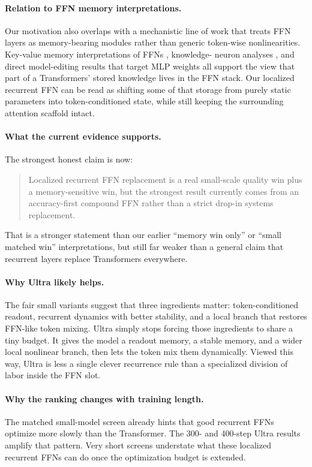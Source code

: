 \documentclass[11pt]{article}
\begin{document}
\paragraph{Relation to FFN memory interpretations.}
Our motivation also overlaps with a mechanistic line of work that treats FFN
layers as memory-bearing modules rather than generic token-wise nonlinearities.
Key-value memory interpretations of FFNs \citep{geva2020ffnmem}, knowledge-
neuron analyses \citep{dai2021knowledge}, and direct model-editing results that
target MLP weights \citep{meng2022rome} all support the view that part of a
Transformers' stored knowledge lives in the FFN stack. Our localized
recurrent FFN can be read as shifting some of that storage from purely static
parameters into token-conditioned state, while still keeping the surrounding
attention scaffold intact.

\paragraph{What the current evidence supports.}
The strongest honest claim is now:
\begin{quote}
Localized recurrent FFN replacement is a real small-scale quality win plus a
memory-sensitive win, but the strongest result currently comes from an
accuracy-first compound FFN rather than a strict drop-in systems replacement.
\end{quote}
That is a stronger statement than our earlier ``memory win only'' or ``small
matched win'' interpretations, but still far weaker than a general claim that
recurrent layers replace Transformers everywhere.

\paragraph{Why Ultra likely helps.}
The fair small variants suggest that three ingredients matter: token-conditioned
readout, recurrent dynamics with better stability, and a local branch that
restores FFN-like token mixing. Ultra simply stops forcing those ingredients to
share a tiny budget. It gives the model a readout memory, a stable memory, and
a wider local nonlinear branch, then lets the token mix them dynamically.
Viewed this way, Ultra is less a single clever recurrence rule than a
specialized division of labor inside the FFN slot.

\paragraph{Why the ranking changes with training length.}
The matched small-model screen already hints that good recurrent FFNs optimize
more slowly than the Transformer. The 300- and 400-step Ultra results amplify
that pattern. Very short screens understate what these localized recurrent FFNs
can do once the optimization budget is extended.
\end{document}
